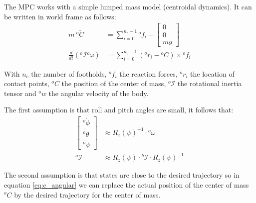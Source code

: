 \documentclass[a4paper,11pt]{article}
\begin{document}
The MPC works with a simple lumped mass model (centroidal dynamics). It can be written in world frame as follows:
\begin{align}
	m ~ {}^o\!  \ddot C &= \sum_{i=0}^{n_c - 1} {}^o\!f_i - \begin{bmatrix} 0 \\ 0 \\ mg \end{bmatrix} \label{eq:c_linear}\\
	\frac{d}{dt}({}^o\!\mathcal{I} {}^o\!\omega) &= \sum_{i=0}^{n_c - 1} ({}^o\!r_i - {}^o\!C) \times {}^o\!f_i \label{eq:c_angular}
\end{align}

With $n_c$ the number of footholds, ${}^o\!f_i$ the reaction forces, ${}^o\!r_i$ the location of contact points, ${}^o\!C$ the position of the center of mass, ${}^o\!\mathcal{I}$ the rotational inertia tensor and ${}^o\!w$ the angular velocity of the body.

The first assumption is that roll and pitch angles are small, it follows that:
\begin{align}
\begin{bmatrix} {}^o\! \dot \phi \\ {}^o\! \dot \theta \\ {}^o\! \dot \psi \end{bmatrix} &\approx R_z(\psi)^{-1} \cdot {}^o\!\omega \label{eq:assumption1} \\ 
{}^o\! \mathcal{I} &\approx R_z(\psi) \cdot {}^b\! \mathcal{I} \cdot R_z(\psi)^{-1} 
\end{align}

The second assumption is that states are close to the desired trajectory so in equation \ref{eq:c_angular} we can replace the actual position of the center of mass ${}^o\!C$ by the desired trajectory for the center of mass.
\end{document}

